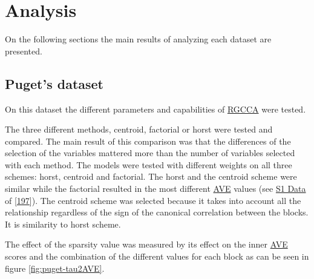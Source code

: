 \documentclass[
  12pt,
  a4paper,
  twoside,
  openright]{book}
\begin{document}
\hypertarget{analysis}{%
\section{Analysis}\label{analysis}}

On the following sections the main results of analyzing each dataset are presented.







\hypertarget{results-puget}{%
\subsection{Puget's dataset}\label{results-puget}}

On this dataset the different parameters and capabilities of \protect\hyperlink{acronyms_RGCCA}{RGCCA} were tested.

The three different methods, centroid, factorial or horst were tested and compared.
The main result of this comparison was that the differences of the selection of the variables mattered more than the number of variables selected with each method.
The models were tested with different weights on all three schemes: horst, centroid and factorial.
The horst and the centroid scheme were similar while the factorial resulted in the most different \protect\hyperlink{acronyms_AVE}{AVE} values (see \href{https://journals.plos.org/plosone/article?id=10.1371/journal.pone.0246367\#pone.0246367.s001}{S1 Data} of {[}\protect\hyperlink{ref-revilla2021}{197}{]}).
The centroid scheme was selected because it takes into account all the relationship regardless of the sign of the canonical correlation between the blocks.
It is similarity to horst scheme.

The effect of the sparsity value was measured by its effect on the inner \protect\hyperlink{acronyms_AVE}{AVE} scores and the combination of the different values for each block as can be seen in figure \ref{fig:puget-tau2AVE}.
\end{document}
